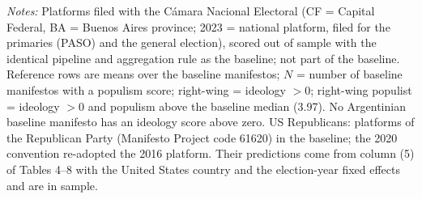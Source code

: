 \begin{table}[htbp]
\begin{tabular}{@{}lcccccccr@{}}
\bottomrule\end{tabular}
\begin{minipage}{0.95\textwidth}\vspace{2pt}\scriptsize\textit{Notes:} Platforms filed with the C\'amara Nacional Electoral (CF = Capital Federal, BA = Buenos Aires province; 2023 = national platform, filed for the primaries (PASO) and the general election), scored out of sample with the identical pipeline and aggregation rule as the baseline; not part of the baseline. Reference rows are means over the baseline manifestos; $N$ = number of baseline manifestos with a populism score; right-wing = ideology $> 0$; right-wing populist = ideology $> 0$ and populism above the baseline median (3.97). No Argentinian baseline manifesto has an ideology score above zero. US Republicans: platforms of the Republican Party (Manifesto Project code 61620) in the baseline; the 2020 convention re-adopted the 2016 platform. Their predictions come from column (5) of Tables 4--8 with the United States country and the election-year fixed effects and are in sample.\end{minipage}
\end{table}
